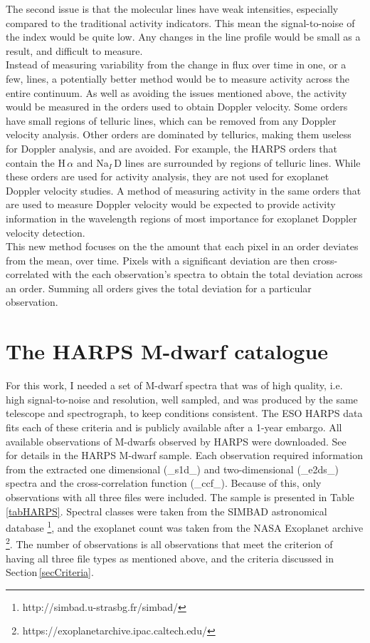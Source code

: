 The second issue is that the molecular lines have weak intensities, especially compared to the traditional activity indicators. This mean the signal-to-noise of the index would be quite low. Any changes in the line profile would be small as a result, and difficult to measure.\\

Instead of measuring variability from the change in flux over time in one, or a few, lines, a potentially better method would be to measure activity across the entire continuum. As well as avoiding the issues mentioned above, the activity would be measured in the orders used to obtain Doppler velocity. Some orders have small regions of telluric lines, which can be removed from any Doppler velocity analysis. Other orders are dominated by tellurics, making them useless for Doppler analysis, and are avoided. For example, the HARPS orders that contain the H\,$\alpha$ and Na$_{I}$\,D lines are surrounded by regions of telluric lines. While these orders are used for activity analysis, they are not used for exoplanet Doppler velocity studies. A method of measuring activity in the same orders that are used to measure Doppler velocity would be expected to provide activity information in the wavelength regions of most importance for exoplanet Doppler velocity detection.\\

This new method focuses on the the amount that each pixel in an order deviates from the mean, over time. Pixels with a significant deviation are then cross-correlated with the each observation's spectra to obtain the total deviation across an order. Summing all orders gives the total deviation for a particular observation.

\section{The HARPS M-dwarf catalogue}
\label{secHARPS}
For this work, I needed a set of M-dwarf spectra that was of high quality, i.e. high signal-to-noise and resolution, well sampled, and was produced by the same telescope and spectrograph, to keep conditions consistent. The ESO HARPS data fits each of these criteria and is publicly available after a 1-year embargo. All available observations of M-dwarfs observed by HARPS were downloaded. See \,\citep{2013Bonfils} for details in the HARPS M-dwarf sample. Each observation required information from the extracted one dimensional (\_s1d\_) and two-dimensional (\_e2ds\_) spectra and the cross-correlation function (\_ccf\_). Because of this, only observations with all three files were included. The sample is presented in Table\,\ref{tabHARPS}. Spectral classes were taken from the SIMBAD astronomical database \footnote{http://simbad.u-strasbg.fr/simbad/}, and the exoplanet count was taken from the NASA Exoplanet archive \footnote{https://exoplanetarchive.ipac.caltech.edu/}. The number of observations is all observations that meet the criterion of having all three file types as mentioned above, and the criteria discussed in Section\,\ref{secCriteria}.\\

